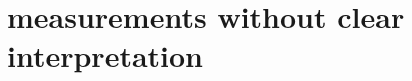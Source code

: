 \documentclass[
10pt,					%
a4paper,				%
twoside,				%
BCOR=8mm,				%
headings=normal,		%
headsepline,			%
footsepline,			%
plainfootsepline,		%
]{scrbook}
\begin{document}
   \section{measurements without clear interpretation}
      
	\printindex
\backmatter{}
  \printbibliography  
  
  
  
  
  
  

\end{document}
